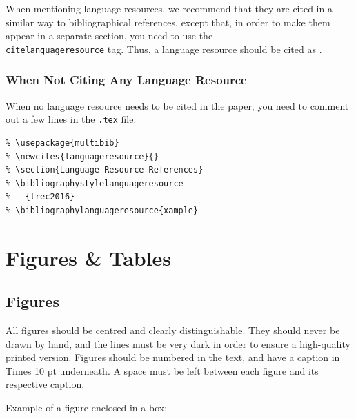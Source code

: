 \documentclass[10pt, a4paper]{article}
\begin{document}
When mentioning language resources, we recommend that they are cited in
a similar way to bibliographical references, except that, in order to make them
appear in a separate section, you need to use the
\texttt{\\citelanguageresource} tag. Thus, a language resource should be cited
as .


\subsubsection{When Not Citing Any Language Resource}

When no language resource needs to be cited in the paper, you need to comment
out a few lines in the \texttt{.tex} file:

\begin{verbatim}
% \usepackage{multibib}
% \newcites{languageresource}{}
% \section{Language Resource References}
% \bibliographystylelanguageresource
%   {lrec2016}
% \bibliographylanguageresource{xample}
\end{verbatim}

\section{Figures \& Tables}
\subsection{Figures}

All figures should be centred and clearly distinguishable. They should never be
drawn by hand, and the lines must be very dark in order to ensure a high-quality
printed version. Figures should be numbered in the text, and have a caption in
Times 10 pt underneath. A space must be left between each figure and its
respective caption. 

Example of a figure enclosed in a box:
\end{document}
